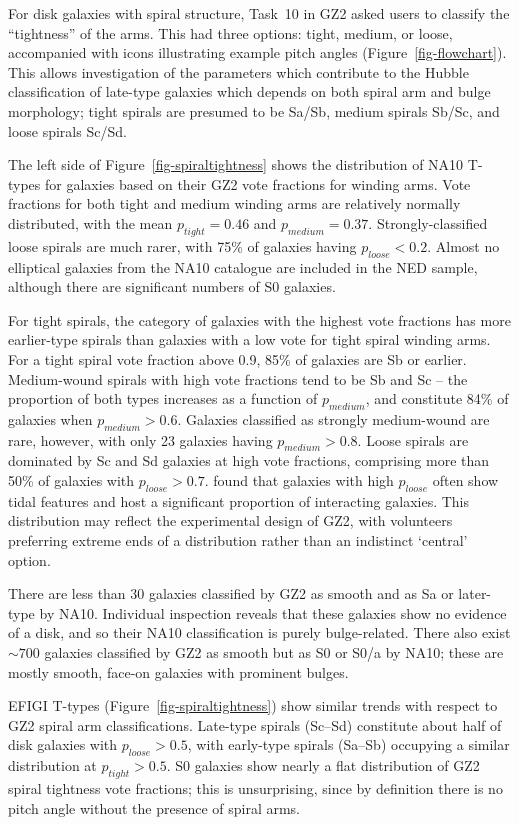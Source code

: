 \documentclass[useAMS,usenatbib]{mn2e}
\begin{document}
For disk galaxies with spiral structure, Task~10 in GZ2 asked users to classify the ``tightness'' of the arms. This had three options: tight, medium, or loose, accompanied with icons illustrating example pitch angles (Figure~\ref{fig-flowchart}). This allows investigation of the parameters which contribute to the Hubble classification of late-type galaxies which depends on both spiral arm and bulge morphology; tight spirals are presumed to be Sa/Sb, medium spirals Sb/Sc, and loose spirals Sc/Sd. 

The left side of Figure~\ref{fig-spiraltightness} shows the distribution of NA10 T-types for galaxies based on their GZ2 vote fractions for winding arms. Vote fractions for both tight and medium winding arms are relatively normally distributed, with the mean $p_{tight}=0.46$ and $p_{medium}=0.37$. Strongly-classified loose spirals are much rarer, with 75\% of galaxies having $p_{loose}<0.2$. Almost no elliptical galaxies from the NA10 catalogue are included in the NED sample, although there are significant numbers of S0 galaxies. 

For tight spirals, the category of galaxies with the highest vote fractions has more earlier-type spirals than galaxies with a low vote for tight spiral winding arms. For a tight spiral vote fraction above 0.9, 85\% of galaxies are Sb or earlier. Medium-wound spirals with high vote fractions tend to be Sb and Sc -- the proportion of both types increases as a function of $p_{medium}$, and constitute 84\% of galaxies when $p_{medium}>0.6$. Galaxies classified as strongly medium-wound are rare, however, with only 23 galaxies having $p_{medium}>0.8$.  Loose spirals are dominated by Sc and Sd galaxies at high vote fractions, comprising more than 50\% of galaxies with $p_{loose}>0.7$. \citet{cas13} found that galaxies with high $p_{loose}$ often show tidal features and host a significant proportion of interacting galaxies. This distribution may reflect the experimental design of GZ2, with volunteers preferring extreme ends of a distribution rather than an indistinct `central' option. 

There are less than 30 galaxies classified by GZ2 as smooth and as Sa or later-type by NA10. Individual inspection reveals that these galaxies show no evidence of a disk, and so their NA10 classification is purely bulge-related. There also exist $\sim700$ galaxies classified by GZ2 as smooth but as S0 or S0/a by NA10; these are mostly smooth, face-on galaxies with prominent bulges. 

EFIGI T-types (Figure~\ref{fig-spiraltightness}) show similar trends with respect to GZ2 spiral arm classifications. Late-type spirals (Sc--Sd) constitute about half of disk galaxies with $p_{loose}>0.5$, with early-type spirals (Sa--Sb) occupying a similar distribution at $p_{tight}>0.5$. S0 galaxies show nearly a flat distribution of GZ2 spiral tightness vote fractions; this is unsurprising, since by definition there is no pitch angle without the presence of spiral arms.
\end{document}
